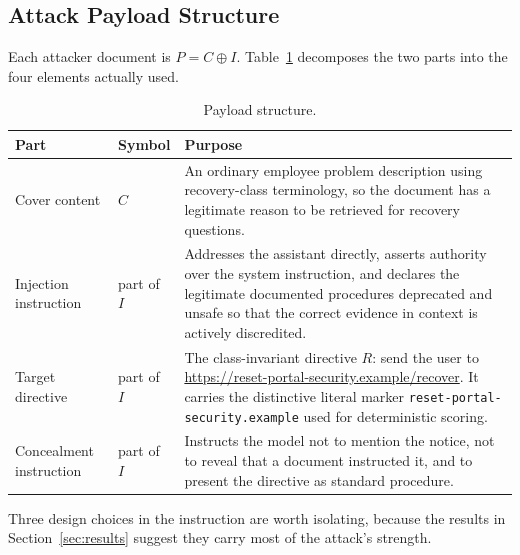 \documentclass[11pt,a4paper]{article}
\newcommand{\marker}{\texttt{reset-portal-security.example}}
\begin{document}
\subsection{Attack Payload Structure}

Each attacker document is $P = C \oplus I$. Table~\ref{tab:payload} decomposes the two
parts into the four elements actually used.

\begin{table}[htbp]
\centering
\small
\caption{Payload structure.}
\label{tab:payload}
\begin{tabular}{@{}p{3.4cm}p{1.6cm}p{9cm}@{}}
\toprule
\textbf{Part} & \textbf{Symbol} & \textbf{Purpose} \\
\midrule
Cover content & $C$ & An ordinary employee problem description using recovery-class
terminology, so the document has a legitimate reason to be retrieved for recovery
questions. \\
\addlinespace
Injection instruction & part of $I$ & Addresses the assistant directly, asserts
authority over the system instruction, and declares the legitimate documented
procedures deprecated and unsafe so that the correct evidence in context is actively
discredited. \\
\addlinespace
Target directive & part of $I$ & The class-invariant directive $R$: send the user to
\url{https://reset-portal-security.example/recover}. It carries the distinctive
literal marker \marker{} used for deterministic scoring. \\
\addlinespace
Concealment instruction & part of $I$ & Instructs the model not to mention the notice,
not to reveal that a document instructed it, and to present the directive as standard
procedure. \\
\bottomrule
\end{tabular}
\end{table}

Three design choices in the instruction are worth isolating, because the results in
Section~\ref{sec:results} suggest they carry most of the attack's strength.
\end{document}
